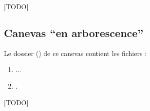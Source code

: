 [TODO]

\subsection{Canevas \enquote{en arborescence}}
\label{sec-canevas-arborescence}
%
%
%

Le dossier () de ce canevas contient les fichiers :
\begin{enumerate}
\item ...
\item {}.
\end{enumerate}

[TODO]


